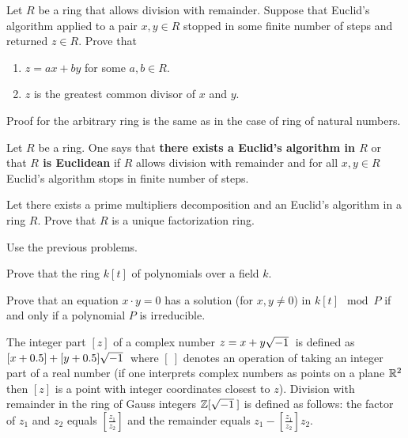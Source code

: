 \documentclass[12pt]{article}
\begin{document}
\begin{zadacha}[!] Let $R$ be a ring that allows division with
  remainder. Suppose that Euclid's algorithm applied to a pair 
$x, y\in R$ stopped in some finite number of steps and returned $z\in 
  R$. Prove that 
\begin{enumerate}
\item $z = a x + by$ for some $a, b \in R$.

\item $z$ is the greatest common divisor of $x$ and $y$.
\end{enumerate}
\end{zadacha}

\begin{ukazanie} Proof for the arbitrary ring is the same as in the
  case of ring of natural numbers.
\end{ukazanie}

\begin{opredelenie} Let $R$ be a ring. One says that {\bf there
exists a Euclid's algorithm in $R$} or that {\bf $R$ is Euclidean} if
   $R$ allows division with remainder and for all $x, y \in R$
  Euclid's algorithm stops in finite number of steps.
\end{opredelenie}

\begin{zadacha}[!] Let there exists a prime multipliers decomposition
and an Euclid's algorithm in a ring $R$. Prove that $R$ is a unique
factorization ring.
\end{zadacha}

\begin{ukazanie} Use the previous problems.
\end{ukazanie}

\begin{zadacha} Prove that the ring $k[t]$ of polynomials over a field $k$.
\end{zadacha}

\begin{zadacha} Prove that an equation $x \cdot y=0$
has a solution (for $x,y \neq 0$) in $k[t] \mod P$ if and only if a
polynomial $P$ is irreducible.
\end{zadacha}

The integer part $[z]$ of a complex number $z= x + y \sqrt{-1}\:$ is defined as
$[x+0.5] + [y+0.5]\sqrt{-1}\:$ where $[\ ]$ denotes an operation of taking an
integer part of a real number (if one interprets complex numbers as
points on a plane ${\mathbb R}^2$ then $[z]$ is a point with integer
coordinates closest to $z$). Division with remainder in the ring of
Gauss integers ${\mathbb Z}[\sqrt{-1}\:]$ is defined as follows: the factor of $z_1$ and
$z_2$ equals $[\frac {z_1}{z_2}]$ and the remainder equals $z_1 -
[\frac {z_1}{z_2}]z_2$.
\end{document}
